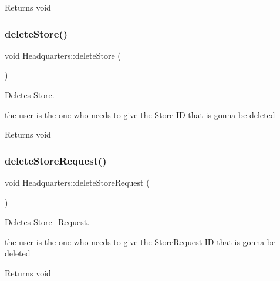 \begin{DoxyReturn}{Returns}
void 
\end{DoxyReturn}
\mbox{\label{class_headquarters_a39ceab5aab4576d7d082dd6e3c3cb2b5}} 
\subsubsection{\texorpdfstring{delete\+Store()}{deleteStore()}}
{\footnotesize\ttfamily void Headquarters\+::delete\+Store (\begin{DoxyParamCaption}{ }\end{DoxyParamCaption})}



Deletes \hyperlink{class_store}{Store}. 

the user is the one who needs to give the \hyperlink{class_store}{Store} ID that is gonna be deleted

\begin{DoxyReturn}{Returns}
void 
\end{DoxyReturn}
\mbox{\label{class_headquarters_a23aa276f89e9841bede6780c4bff341e}} 
\subsubsection{\texorpdfstring{delete\+Store\+Request()}{deleteStoreRequest()}}
{\footnotesize\ttfamily void Headquarters\+::delete\+Store\+Request (\begin{DoxyParamCaption}{ }\end{DoxyParamCaption})}



Deletes \hyperlink{class_store___request}{Store\+\_\+\+Request}. 

the user is the one who needs to give the Store\+Request ID that is gonna be deleted

\begin{DoxyReturn}{Returns}
void 
\end{DoxyReturn}
\mbox{\label{class_headquarters_a0d5357a865f5ccdf194404b97f04816a}} 
